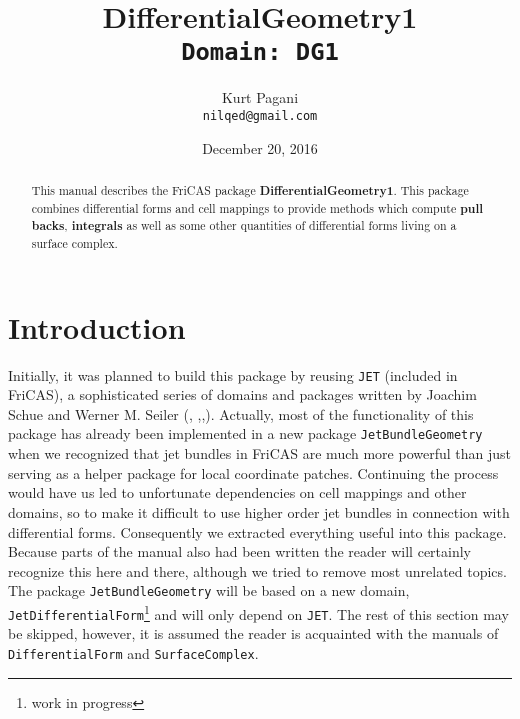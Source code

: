 \documentclass[12pt,a4paper]{article}
\author{Kurt Pagani \\ {\tt nilqed@gmail.com}}
\date{December 20, 2016}
\title{DifferentialGeometry1 \\ {\small\tt Domain: DG1}}
\begin{document}
\maketitle
%
\begin{abstract}
This manual describes the FriCAS package {\bf DifferentialGeometry1}.
This package combines differential forms and cell mappings to provide 
methods which compute {\bf pull backs}, {\bf integrals} as well as
some other quantities of differential forms living on a surface 
complex.
\end{abstract}
%
\tableofcontents
\section{Introduction}
Initially, it was planned to build this package by reusing
{\tt JET} (included in FriCAS), a sophisticated series of domains and 
packages written by Joachim Schue and Werner M. Seiler (\cite{wms:aci},
\cite{wms:axiom},\cite{wms:diss},\cite{wms:jet}). Actually, most of
the functionality of this package has already been implemented in
a new package {\tt JetBundleGeometry} when we recognized that jet
bundles in FriCAS are much more powerful than just serving as a 
helper package for local coordinate patches. Continuing the process
would have us led to unfortunate dependencies on cell mappings and
other domains, so to make it difficult to use higher order jet bundles
in connection with differential forms. Consequently we extracted 
everything useful into this package. Because parts of the manual
also had been written the reader will certainly recognize this
here and there, although we tried to remove most unrelated topics.
The package {\tt JetBundleGeometry} will be based on a new domain,
{\tt JetDifferentialForm}\footnote{work in progress} and will only 
depend on {\tt JET}. The rest of this section may be skipped, however, 
it is assumed the reader is acquainted with the manuals of 
{\tt DifferentialForm} and {\tt SurfaceComplex}. 
\end{document}
